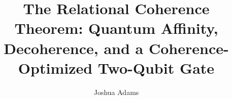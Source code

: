 \documentclass[a4paper,onecolumn,11pt,unpublished]{quantumarticle}
\begin{document}

\title{The Relational Coherence Theorem: Quantum Affinity, Decoherence,
       and a Coherence-Optimized Two-Qubit Gate}

\author{Joshua Adams}

\maketitle

\begin{abstract}

\end{abstract}\newpage









\appendix
\newpage



\end{document}
